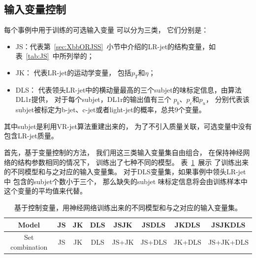 \subsection{输入变量控制}
\label{sec:XbbTagger1}

每个事例中用于训练的可选输入变量
可以分为三类，
它们分别是：
\begin{itemize}
       \item JS：代表第~\ref{sec:XbbORJSS}~小节中介绍的LR-jet的结构变量，如表~\ref{tab:JS}~中所列举的；
       \item JK：%
       代表LR-jet的运动学变量，
       包括$p_{T}$和$\eta$；
       \item DLS：%
       代表领头LR-jet中的横动量最高的三个subjet的味标定信息，由算法DL1r提供，
       对于每个subjet，DL1r的输出值有三个
       $p_b$、$p_c$和$p_u$，
       分别代表该subjet被标定为b-jet、c-jet或者light-jet的概率，总共9个变量。
\end{itemize}
其中subjet是利用VR-jet算法重建出来的，
为了不引入质量关联，可选变量中没有包含LR-jet质量。

首先，基于变量控制的方法，
我们用这三类输入变量集自由组合，
在保持神经网络的结构参数相同的情况下，
训练出了七种不同的模型。
表~\ref{tab:MODELS}~展示
了训练出来的不同模型和与之对应的输入变量集。
对于DLS变量集，如果事例中领头LR-jet中
包含的subjet个数小于三个，
那么缺失的subjet
味标定信息将会由训练样本中这个变量的平均值来代替。

\begin{table}[ht]
\caption{基于控制变量，用神经网络训练出来的不同模型和与之对应的输入变量集。}
\begin{center}
\begin{adjustbox}{width=\columnwidth,center}
\begin{tabular}{c|c|c|c|c|c|c|c}
    \hline
    \hline
    Model & JS & JK & DLS & JSJK & JSDLS & JKDLS & JSJKDLS \\
    \hline  
    Set combination & JS & JK & DLS & JS+JK & JS+DLS & JK+DLS & JS+JK+DLS\\
    \hline
    \hline
\end{tabular}
\end{adjustbox}
\end{center}
\label{tab:MODELS}
\end{table}

